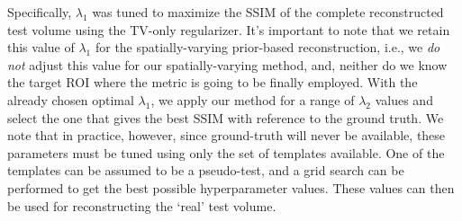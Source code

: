 \documentclass[journal]{IEEEtran}
\begin{document}
Specifically, $\lambda_1$ was tuned to maximize the SSIM of the
complete reconstructed test volume using the TV-only regularizer.
It's important to note that we retain this value of $\lambda_1$ for
the spatially-varying prior-based reconstruction, i.e., we \emph{do
  not} adjust this value for our spatially-varying method, and,
neither do we know the target ROI where the metric is going to be
finally employed.  With the already chosen optimal $\lambda_1$, we
apply our method for a range of $\lambda_2$ values and select the one
that gives the best SSIM with reference to the ground
truth. %
We note that in practice, however, since ground-truth will never be
available, these parameters must be tuned using only the set of
templates available.  One of the templates can be assumed to be a
pseudo-test, and a grid search can be performed to get the best
possible hyperparameter values. These values can then be used for
reconstructing the `real' test volume. 

\end{document}
